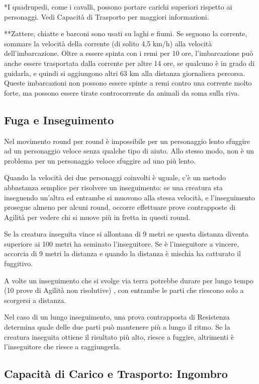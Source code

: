 \documentclass[a4paper,11pt,twoside,openany]{book}
\begin{document}
{*I quadrupedi, come i cavalli, possono portare carichi superiori rispetto ai personaggi. Vedi Capacità di Trasporto per maggiori informazioni.

**Zattere, chiatte e barconi sono usati su laghi e fiumi. Se seguono la corrente, sommare la velocità della corrente (di solito 4,5 km/h) alla velocità dell'imbarcazione. Oltre a essere spinta con i remi per 10 ore, l'imbarcazione può anche essere trasportata dalla corrente per altre 14 ore, se qualcuno è in grado di guidarla, e quindi si aggiungono altri 63 km alla distanza giornaliera percorsa. Queste imbarcazioni non possono essere spinte a remi contro una corrente molto forte, ma possono essere tirate controcorrente da animali da soma sulla riva.

\subsection{Fuga e Inseguimento}

Nel movimento round per round è impossibile per un personaggio lento sfuggire ad un personaggio veloce senza qualche tipo di aiuto. Allo stesso modo, non è un problema per un personaggio veloce sfuggire ad uno più lento.

Quando la velocità dei due personaggi coinvolti è uguale, c'è un metodo abbastanza semplice per risolvere un inseguimento: se una creatura sta inseguendo un'altra ed entrambe si muovono alla stessa velocità, e l'inseguimento prosegue almeno per alcuni round, occorre effettuare prove contrapposte di Agilità per vedere chi si muove più in fretta in questi round.

Se la creatura inseguita vince si allontana di 9 metri se questa distanza diventa superiore ai 100 metri ha seminato l'inseguitore. Se è l'inseguitore a vincere, accorcia di 9 metri la distanza e quando la distanza è mischia ha catturato il fuggitivo.

A volte un inseguimento che si svolge via terra potrebbe durare per lungo tempo (10 prove di Agilità non risolutive) , con entrambe le parti che riescono solo a scorgersi a distanza.

Nel caso di un lungo inseguimento, una prova contrapposta di Resistenza determina quale delle due parti può mantenere più a lungo il ritmo. Se la creatura inseguita ottiene il risultato più alto, riesce a fuggire, altrimenti è l'inseguitore che riesce a raggiungerla.

\subsection{Capacità di Carico e Trasporto: Ingombro}

}
\end{document}
